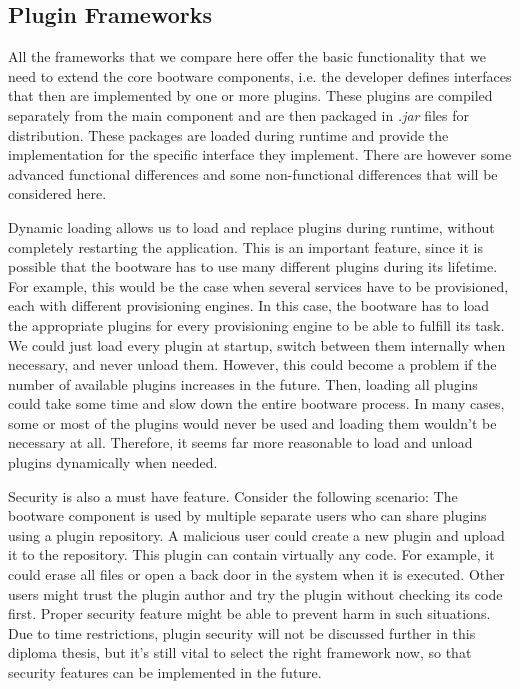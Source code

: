 \subsection{Plugin Frameworks}
\label{implementation:selecting:pluginframeworks}

All the frameworks that we compare here offer the basic functionality that we need to extend the core bootware components, i.e. the developer defines interfaces that then are implemented by one or more plugins.
These plugins are compiled separately from the main component and are then packaged in \textit{.jar} files for distribution.
These packages are loaded during runtime and provide the implementation for the specific interface they implement.
There are however some advanced functional differences and some non-functional differences that will be considered here.

Dynamic loading allows us to load and replace plugins during runtime, without completely restarting the application.
This is an important feature, since it is possible that the bootware has to use many different plugins during its lifetime.
For example, this would be the case when several services have to be provisioned, each with different provisioning engines.
In this case, the bootware has to load the appropriate plugins for every provisioning engine to be able to fulfill its task.
We could just load every plugin at startup, switch between them internally when necessary, and never unload them.
However, this could become a problem if the number of available plugins increases in the future.
Then, loading all plugins could take some time and slow down the entire bootware process.
In many cases, some or most of the plugins would never be used and loading them wouldn't be necessary at all.
Therefore, it seems far more reasonable to load and unload plugins dynamically when needed.

Security is also a must have feature.
Consider the following scenario: The bootware component is used by multiple separate users who can share plugins using a plugin repository.
A malicious user could create a new plugin and upload it to the repository.
This plugin can contain virtually any code.
For example, it could erase all files or open a back door in the system when it is executed.
Other users might trust the plugin author and try the plugin without checking its code first.
Proper security feature might be able to prevent harm in such situations.
Due to time restrictions, plugin security will not be discussed further in this diploma thesis, but it's still vital to select the right framework now, so that security features can be implemented in the future.

